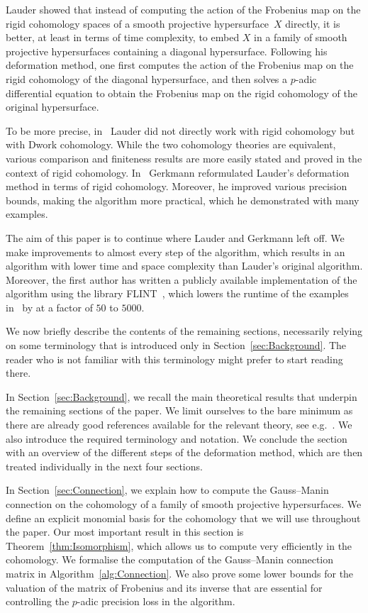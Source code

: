 \documentclass[a4paper,11pt]{article}
\numberwithin{equation}{section}
\theoremstyle{definition}
\begin{document}
Lauder \citep{Lauder2004a,Lauder2004b} showed that instead of computing the 
action of the Frobenius map on the rigid cohomology spaces of a smooth 
projective hypersurface~$X$ directly, it is better, at least in terms of 
time complexity, to embed $X$ in a family of smooth projective hypersurfaces 
containing a diagonal hypersurface.  Following his deformation method, 
one first computes the action of the Frobenius map on the rigid cohomology 
of the diagonal hypersurface, and then solves a $p$-adic differential equation 
to obtain the Frobenius map on the rigid cohomology of the original 
hypersurface. 

To be more precise, in~\citep{Lauder2004a,Lauder2004b} Lauder did not directly 
work with rigid cohomology but with Dwork cohomology. While the two 
cohomology theories are equivalent, various comparison and finiteness results 
are more easily stated and proved in the context of rigid cohomology.  In~\citep{Gerkmann2007} 
Gerkmann reformulated Lauder's deformation method in terms of rigid 
cohomology.  Moreover, he improved various precision bounds, making 
the algorithm more practical, which he demonstrated with many examples.

The aim of this paper is to continue where Lauder and Gerkmann left off. 
We make improvements to almost every step of the algorithm, which results in 
an algorithm with lower time and space complexity than Lauder's original 
algorithm. Moreover, the first author has written a publicly available 
implementation of the algorithm using the library FLINT~\citep{FLINT}, which  
lowers the runtime of the examples in~\citep{Gerkmann2007} by at a factor 
of $50$ to $5000$.

We now briefly describe the contents of the remaining sections,
necessarily relying on some terminology that is introduced only 
in Section~\ref{sec:Background}.  The reader who is not familiar 
with this terminology might prefer to start reading there.

In Section~\ref{sec:Background}, we recall the main theoretical results that 
underpin the remaining sections of the paper.  We limit ourselves to the bare 
minimum as there are already good references available for the relevant theory, 
see e.g.~\citep{Kedlaya2012}. We also introduce the required terminology and 
notation. We conclude the section with an overview of the different steps of 
the deformation method, which are then treated individually in the next four 
sections.

In Section~\ref{sec:Connection}, we explain how to compute the Gauss--Manin 
connection on the cohomology of a family of smooth projective hypersurfaces. 
We define an explicit monomial basis for the cohomology that we will use 
throughout the paper. Our most important result in this section
is Theorem~\ref{thm:Isomorphism}, which allows us to compute very efficiently 
in the cohomology. We formalise the computation of the Gauss--Manin connection 
matrix in Algorithm~\ref{alg:Connection}. We also prove some lower bounds for 
the valuation of the matrix of Frobenius and its inverse that are essential 
for controlling the $p$-adic precision loss in the algorithm.
\end{document}
